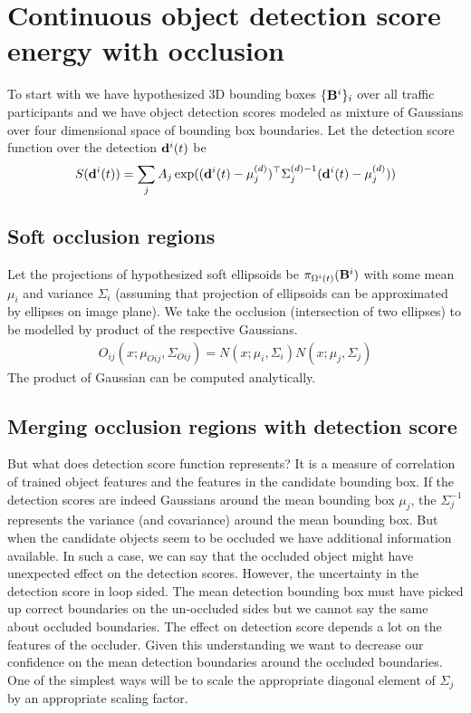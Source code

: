 \documentclass[10pt,twocolumn,letterpaper]{article}
\begin{document}
\section{Continuous object detection score energy with occlusion} 

To start with we have hypothesized 3D bounding boxes $\{ \mathbf{B}^{i} \}_i$
over all traffic participants and we have object detection scores modeled as
mixture of Gaussians over four dimensional space of bounding box boundaries.
Let the detection score function over the detection $\mathbf{d}^{i}(t)$ be 
%
\begin{align}
  S(\mathbf{d}^{i}(t)) = \sum_j A_j \exp((\mathbf{d}^{i}(t)-\mu^{(d)}_j)^\top \Sigma^{(d)-1}_j
  (\mathbf{d}^{i}(t)-\mu^{(d)}_j))
\end{align}
%

\subsection{Soft occlusion regions}
Let the projections of hypothesized soft ellipsoids be
$\pi_{\Omega^{i}(t)}(\mathbf{B}^{i})$ with some mean $\mu_i$ and variance $\Sigma_i$
(assuming that projection of ellipsoids can be approximated by ellipses on
image plane). We take the occlusion (intersection of two ellipses) to be
modelled by product of the respective Gaussians.
%
\begin{align}
  O_{ij}(x; \mu_{Oij}, \Sigma_{Oij}) = N(x; \mu_i, \Sigma_i)N(x; \mu_j,
  \Sigma_j)
\end{align}
%
The product of Gaussian can be computed analytically. 

\subsection{Merging occlusion regions with detection score}
But what does detection score function represents? It is a measure of
correlation of trained object features and the features in the candidate
bounding box. If the detection scores are indeed Gaussians around the mean
bounding box $\mu_j$, the $\Sigma_j^{-1}$ represents the variance (and
covariance) around the mean bounding box. But when the candidate objects seem
to be occluded we have additional information available. In such a case, we
can say that the occluded object might have unexpected effect on the detection
scores. However, the uncertainty in the detection score in loop sided. The
mean detection bounding box must have picked up correct boundaries on the
un-occluded sides but we cannot say the same about occluded boundaries. The
effect on detection score depends a lot on the features of the occluder. Given
this understanding we want to decrease our confidence on the mean detection
boundaries around the occluded boundaries. One of the simplest ways will be to
scale the appropriate diagonal element of $\Sigma_j$ by an appropriate scaling
factor.
\end{document}
